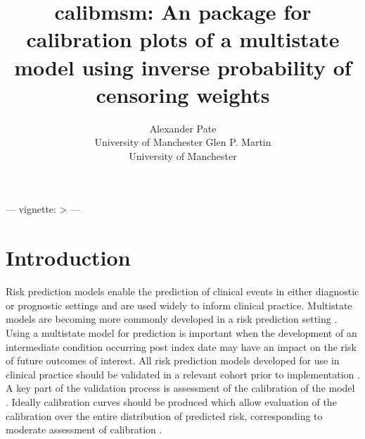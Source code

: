 \documentclass[nojss]{jss}
\author{Alexander Pate\\University of Manchester
  \And Glen P. Martin\\University of Manchester}
\title{calibmsm: An \proglang{R} package for calibration plots of a multistate model using inverse probability of censoring weights}
\begin{document}
---
vignette: >
---



\section[Introduction]{Introduction} \label{sec:intro}

%

Risk prediction models enable the prediction of clinical events in either diagnostic or prognostic settings \citep{VanSmeden2021} and are used widely to inform clinical practice. Multistate models are becoming more commonly developed in a risk prediction setting \citep{Putter2006, Le-Rademacher2018, Lintu2022, Masia2017}. Using a multistate model for prediction is important when the development of an intermediate condition occurring post index date may have an impact on the risk of future outcomes of interest. All risk prediction models developed for use in clinical practice should be validated in a relevant cohort prior to implementation \citep{Steyerberg2016, Sperrin2022}. A key part of the validation process is assessment of the calibration of the model \citep{VanCalster2019}. Ideally calibration curves should be produced which allow evaluation of the calibration over the entire distribution of predicted risk, corresponding to moderate assessment of calibration \citep{VanCalster2016}.
\end{document}
